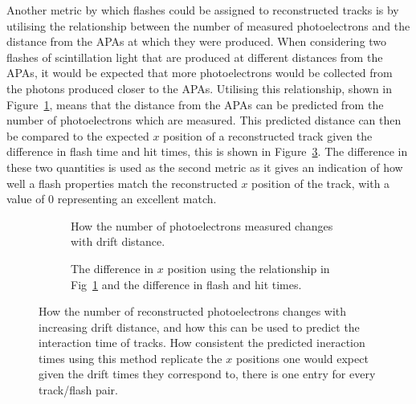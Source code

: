Another metric by which flashes could be assigned to reconstructed tracks is by utilising the relationship between the number of measured photoelectrons and the distance from the APAs at which they were produced. When considering two flashes of scintillation light that are produced at different distances from the APAs, it would be expected that more photoelectrons would be collected from the photons produced closer to the APAs. Utilising this relationship, shown in Figure~\ref{fig:PD_PExPlot}, means that the distance from the APAs can be predicted from the number of photoelectrons which are measured. This predicted distance can then be compared to the expected $x$ position of a reconstructed track given the difference in flash time and hit times, this is shown in Figure~\ref{fig:PD_PEDiffX}. The difference in these two quantities is used as the second metric as it gives an indication of how well a flash properties match the reconstructed $x$ position of the track, with a value of 0 representing an excellent match. \\

\begin{figure}[h!]
  \centering
  \begin{subfigure}{0.45\textwidth}
    \centering
    \caption{How the number of photoelectrons measured changes with drift distance.}
    \label{fig:PD_PExPlot}
  \end{subfigure}
  \hspace{0.08\textwidth}
  \begin{subfigure}{0.45\textwidth}
    \centering
    \caption{The difference in $x$ position using the relationship in Fig~\ref{fig:PD_PExPlot} and the difference in flash and hit times.}
    \label{fig:PD_PEDiffX}
  \end{subfigure}
  \caption[Matching tracks and flashes in the 35 ton using photoelectron information]
          {How the number of reconstructed photoelectrons changes with increasing drift distance, and how this can be used to predict the interaction time of tracks. How consistent the predicted ineraction times using this method replicate the $x$ positions one would expect given the drift times they correspond to, there is one entry for every track/flash pair.}
\end{figure}

